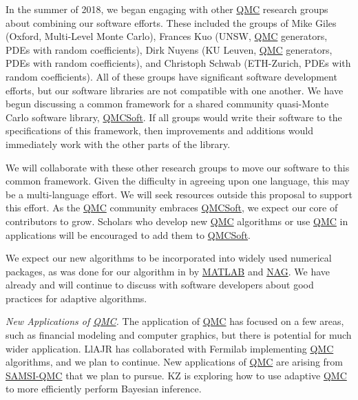 \documentclass[11pt]{NSFamsart}
\newcommand{\QMCSoft}{\hyperlink{QMCSoftlink}{QMCSoft}\xspace}
\newcommand{\QMC}{\hyperlink{QMClink}{QMC}\xspace}
\newcommand{\SAMSIQMC}{\hyperlink{SAMSIlink}{SAMSI-QMC}\xspace}
\newcommand{\NAG}{\hyperlink{NAGlink}{NAG}\xspace}
\newcommand{\MATLAB}{\hyperlink{MATLABlink}{MATLAB}\xspace}
\begin{document}
In the summer of 2018, we began engaging with other \QMC research groups about combining our software efforts.  These included the groups of Mike Giles (Oxford, Multi-Level Monte Carlo),  Frances Kuo (UNSW, \QMC generators, PDEs with random coefficients),  Dirk Nuyens (KU Leuven, \QMC generators, PDEs with random coefficients), and Christoph Schwab (ETH-Zurich, PDEs with random coefficients).  All of these groups have significant software development efforts, but our software libraries are not compatible with one another.  We have begun discussing a common framework for a shared community quasi-Monte Carlo software library, \QMCSoft.  If all groups would write their software to the specifications of this framework, then improvements and additions would immediately work with the other parts of the library.

We will collaborate with these other research groups to move our software to this common framework.  Given the difficulty in agreeing upon one language, this may be a multi-language effort.  We will seek resources outside this proposal to support this effort.  As the \QMC community embraces \QMCSoft, we expect our core of contributors to grow.  Scholars who develop new \QMC algorithms or use \QMC in applications will be encouraged to add them to \QMCSoft.  

We expect our new algorithms to be incorporated into widely used numerical packages, as was done for our algorithm in \cite{HonHic00a} by \MATLAB and \NAG.  We have already and will continue 
to discuss with software developers about good practices for adaptive algorithms.


\emph{New Applications of \QMC.}
The application of \QMC has focused on a few areas, such as financial modeling and computer 
graphics, but there is potential for much wider application.  LlAJR has collaborated with Fermilab implementing \QMC algorithms, and we plan to continue.    New applications of \QMC are arising from \SAMSIQMC that we plan to pursue.  KZ is exploring how to use adaptive \QMC to more efficiently perform Bayesian inference.


\newpage
\clearpage
\setcounter{page}{1}




{\renewcommand\addcontentsline[3]{} 
\renewcommand{\refname}{{\Large\textbf{References Cited}}}                   %
\renewcommand{\bibliofont}{\normalsize}

}
\end{document}
